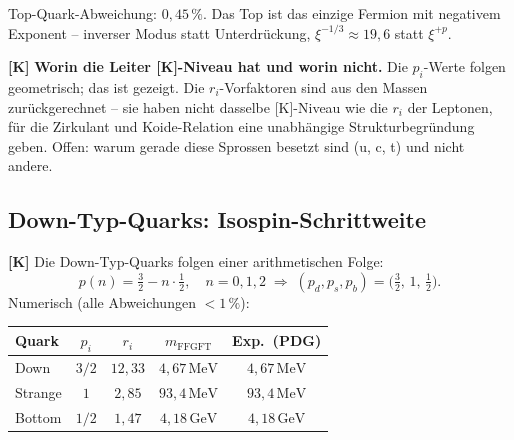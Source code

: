 Top-Quark-Abweichung: $0{,}45\,\%$. Das Top ist das einzige Fermion mit
negativem Exponent -- inverser Modus statt Unterdrückung, $\xi^{-1/3}
\approx19{,}6$ statt $\xi^{+p}$.

\textbf{[K]} \textbf{Worin die Leiter [K]-Niveau hat und worin nicht.}
Die $p_i$-Werte folgen geometrisch; das ist gezeigt. Die $r_i$-Vorfaktoren
sind aus den Massen zurückgerechnet -- sie haben nicht dasselbe [K]-Niveau
wie die $r_i$ der Leptonen, für die Zirkulant und Koide-Relation eine
unabhängige Strukturbegründung geben. Offen: warum gerade diese Sprossen
besetzt sind (u, c, t) und nicht andere.

\subsection{Down-Typ-Quarks: Isospin-Schrittweite}

\textbf{[K]} Die Down-Typ-Quarks folgen einer arithmetischen Folge:
\[
  p(n) = \tfrac32 - n\cdot\tfrac12, \quad n=0,1,2 \;\Rightarrow\;
  (p_d,p_s,p_b) = \bigl(\tfrac32,\,1,\,\tfrac12\bigr).
\]
Numerisch (alle Abweichungen $<1\,\%$):

\begin{center}
\renewcommand{\arraystretch}{1.3}
{\small\begin{tabular}{lcccc}
\toprule
Quark & $p_i$ & $r_i$ & $m_\text{FFGFT}$ & Exp.\ (PDG) \\
\midrule
Down    & $3/2$ & $12{,}33$ & $4{,}67\,\text{MeV}$  & $4{,}67\,\text{MeV}$ \\
Strange & $1$   & $2{,}85$  & $93{,}4\,\text{MeV}$  & $93{,}4\,\text{MeV}$ \\
Bottom  & $1/2$ & $1{,}47$  & $4{,}18\,\text{GeV}$  & $4{,}18\,\text{GeV}$ \\
\bottomrule
\end{tabular}}
\renewcommand{\arraystretch}{1.0}
\end{center}

